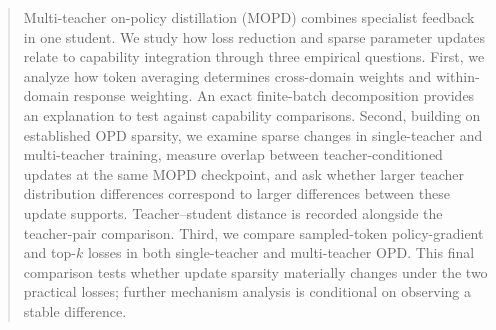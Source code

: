 \begin{abstract}
Multi-teacher on-policy distillation (MOPD) combines specialist feedback
in one student. We study how loss reduction and sparse parameter updates
relate to capability integration through three empirical questions.
First, we analyze how token averaging determines cross-domain weights
and within-domain response weighting. An exact finite-batch decomposition
provides an explanation to test against capability comparisons.
Second, building on established OPD sparsity, we examine sparse changes
in single-teacher and multi-teacher training, measure overlap between
teacher-conditioned updates at the same MOPD checkpoint, and ask whether
larger teacher distribution differences correspond to larger differences
between these update supports. Teacher--student distance is recorded
alongside the teacher-pair comparison. Third, we compare sampled-token
policy-gradient and top-$k$ losses in both single-teacher and multi-teacher
OPD. This final comparison tests whether update sparsity materially
changes under the two practical losses; further mechanism analysis is
conditional on observing a stable difference.
\end{abstract}
